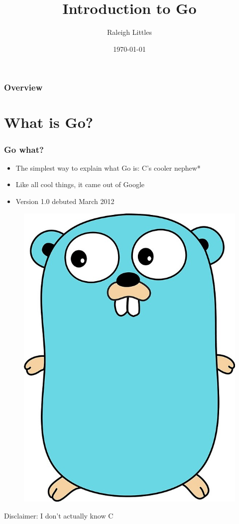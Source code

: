 \documentclass{beamer}
\title[]{Introduction to Go} %
\author{Raleigh Littles} %
\date{\today} %
\begin{document}
\begin{frame}
\titlepage %
\end{frame}

\begin{frame}
\frametitle{Overview} %
\tableofcontents %
\end{frame}


\section{What is Go?} %


\begin{frame}
\frametitle{Go what?}
\begin{itemize}
\item The simplest way to explain what Go is: C's cooler nephew* 
\item Like all cool things, it came out of Google
\item Version 1.0 debuted March 2012
\end{itemize}
\begin{figure}
\includegraphics[width=0.25\columnwidth]{gopher}
\end{figure}

\danger Disclaimer: I don't actually know C \danger
\end{frame}
\end{document}

